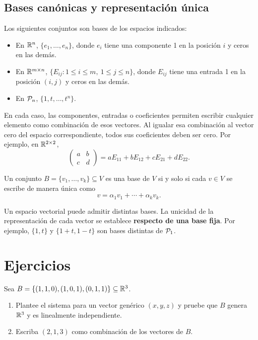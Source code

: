 \documentclass[compacto,10pt]{pubciencias-notas}
\begin{document}
\subsection{Bases canónicas y representación única}

\begin{teo}
    Los siguientes conjuntos son bases de los espacios indicados:
    \begin{itemize}
        \item En $\R^n$, $\{e_1,\ldots,e_n\}$, donde $e_i$ tiene
              una componente 1 en la posición $i$ y ceros en las demás.
        \item En $\Mat[\R]{m}{n}$, $\{E_{ij}:1\le i\le m,\ 1\le j\le n\}$,
              donde $E_{ij}$ tiene una entrada 1 en la posición $(i,j)$
              y ceros en las demás.
        \item En $\Pol_n$, $\{1,t,\ldots,t^n\}$.
    \end{itemize}
\end{teo}

En cada caso, las componentes, entradas o coeficientes permiten escribir
cualquier elemento como combinación de esos vectores. Al igualar esa
combinación al vector cero del espacio correspondiente, todos sus
coeficientes deben ser cero.
Por ejemplo, en $\Mat[\R]{2}{2}$,
\[
    \begin{pmatrix}a&b\\c&d\end{pmatrix}
    =aE_{11}+bE_{12}+cE_{21}+dE_{22}.
\]

\begin{teo}
    Un conjunto $B=\{v_1,\ldots,v_k\}\subseteq V$ es una base de $V$
    si y solo si cada $v\in V$ se escribe de manera única como
    \[
        v=\alpha_1v_1+\cdots+\alpha_kv_k.
    \]
\end{teo}

\begin{advertencia}
    Un espacio vectorial puede admitir distintas bases. La unicidad de
    la representación de cada vector se establece \textbf{respecto de una
    base fija}.
    Por ejemplo, $\{1,t\}$ y $\{1+t,1-t\}$ son bases distintas de $\Pol_1$.
\end{advertencia}

\section{Ejercicios}

\begin{ejer}
    Sea $B=\{(1,1,0),(1,0,1),(0,1,1)\}\subseteq\R^3$.
    \begin{enumerate}
        \item Plantee el sistema para un vector genérico $(x,y,z)$ y
              pruebe que $B$ genera $\R^3$ y es linealmente independiente.
        \item Escriba $(2,1,3)$ como combinación de los vectores de $B$.
    \end{enumerate}
\end{ejer}
\end{document}
